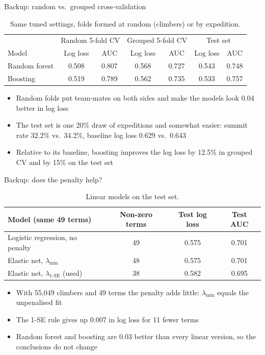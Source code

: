 \documentclass[aspectratio=169,10pt,t]{beamer}
\begin{document}
\begin{frame}{Backup: random vs.\ grouped cross-validation}
\begin{table}
\footnotesize
\begin{tabular}{lcccccc}
\toprule
 & \multicolumn{2}{c}{Random 5-fold CV} & \multicolumn{2}{c}{Grouped 5-fold CV} & \multicolumn{2}{c}{Test set} \\
Model & Log loss & AUC & Log loss & AUC & Log loss & AUC \\
\midrule
Random forest & 0.508 & 0.807 & 0.568 & 0.727 & 0.543 & 0.748 \\
Boosting      & 0.519 & 0.789 & 0.562 & 0.735 & 0.533 & 0.757 \\
\bottomrule
\end{tabular}
\caption{Same tuned settings, folds formed at random (climbers) or by expedition.}
\end{table}
\begin{itemize}\small
  \item Random folds put team-mates on both sides and make the models look 0.04 better in log loss
  \item The test set is one 20\% draw of expeditions and somewhat easier: summit rate 32.2\% vs.\ 34.2\%, baseline log loss 0.629 vs.\ 0.643
  \item Relative to its baseline, boosting improves the log loss by 12.5\% in grouped CV and by 15\% on the test set
\end{itemize}
\end{frame}

\begin{frame}{Backup: does the penalty help?}
\begin{table}
\footnotesize
\begin{tabular}{lccc}
\toprule
Model (same 49 terms) & Non-zero terms & Test log loss & Test AUC \\
\midrule
Logistic regression, no penalty & 49 & 0.575 & 0.701 \\
Elastic net, $\lambda_{\min}$   & 48 & 0.575 & 0.701 \\
Elastic net, $\lambda_{1\text{-SE}}$ (used) & 38 & 0.582 & 0.695 \\
\bottomrule
\end{tabular}
\caption{Linear models on the test set.}
\end{table}
\begin{itemize}\small
  \item With 55,049 climbers and 49 terms the penalty adds little: $\lambda_{\min}$ equals the unpenalised fit
  \item The 1-SE rule gives up 0.007 in log loss for 11 fewer terms
  \item Random forest and boosting are 0.03 better than every linear version, so the conclusions do not change
\end{itemize}
\end{frame}
\end{document}
